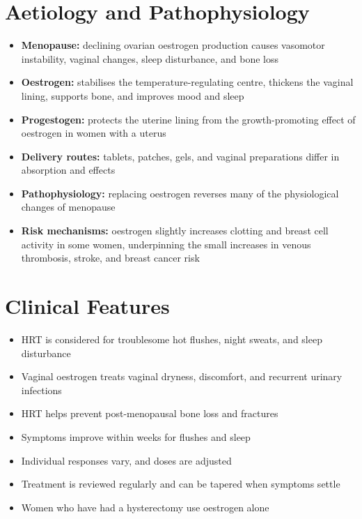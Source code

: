 \section*{Aetiology and Pathophysiology}
\begin{itemize}
    \item \textbf{Menopause:} declining ovarian oestrogen production causes vasomotor instability, vaginal changes, sleep disturbance, and bone loss
    \item \textbf{Oestrogen:} stabilises the temperature-regulating centre, thickens the vaginal lining, supports bone, and improves mood and sleep
    \item \textbf{Progestogen:} protects the uterine lining from the growth-promoting effect of oestrogen in women with a uterus
    \item \textbf{Delivery routes:} tablets, patches, gels, and vaginal preparations differ in absorption and effects
    \item \textbf{Pathophysiology:} replacing oestrogen reverses many of the physiological changes of menopause
    \item \textbf{Risk mechanisms:} oestrogen slightly increases clotting and breast cell activity in some women, underpinning the small increases in venous thrombosis, stroke, and breast cancer risk
\end{itemize}

\section*{Clinical Features}
\begin{itemize}
    \item HRT is considered for troublesome hot flushes, night sweats, and sleep disturbance
    \item Vaginal oestrogen treats vaginal dryness, discomfort, and recurrent urinary infections
    \item HRT helps prevent post-menopausal bone loss and fractures
    \item Symptoms improve within weeks for flushes and sleep
    \item Individual responses vary, and doses are adjusted
    \item Treatment is reviewed regularly and can be tapered when symptoms settle
    \item Women who have had a hysterectomy use oestrogen alone
\end{itemize}

